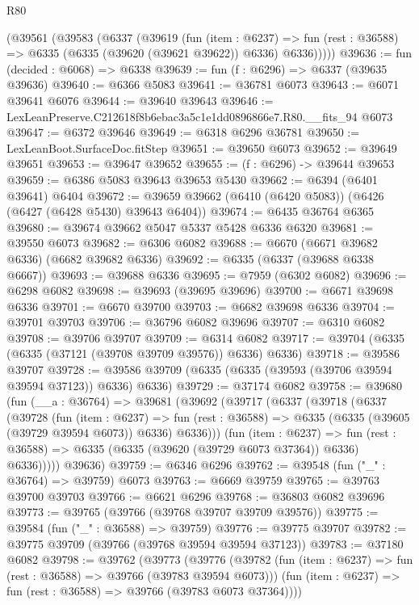 \begin{lexlean}{R80}
\begin{coremodule}
    (@39561
      (@39583
        (@6337
          (@39619
            (fun (item : @6237) =>
            fun (rest : @36588) => @6335 (@6335 (@39620 (@39621 @39622)) @6336) @6336)))))
@39636 := fun (decided : @6068) => @6338
@39639 := fun (f : @6296) => @6337 (@39635 @39636)
@39640 := @6366 @5083
@39641 := @36781 @6073
@39643 := @6071 @39641 @6076
@39644 := @39640 @39643
@39646 := LexLeanPreserve.C212618f8b6ebac3a5c1e1dd0896866e7.R80.__fits_94 @6073
@39647 := @6372 @39646
@39649 := @6318 @6296 @36781
@39650 := LexLeanBoot.SurfaceDoc.fitStep
@39651 := @39650 @6073
@39652 := @39649 @39651
@39653 := @39647 @39652
@39655 := (f : @6296) -> @39644 @39653
@39659 := @6386 @5083 @39643 @39653 @5430
@39662 := @6394 (@6401 @39641) @6404
@39672 := @39659 @39662 (@6410 (@6420 @5083)) (@6426 (@6427 (@6428 @5430) @39643 @6404))
@39674 := @6435 @36764 @6365
@39680 := @39674 @39662 @5047 @5337 @5428 @6336 @6320
@39681 := @39550 @6073
@39682 := @6306 @6082
@39688 := @6670 (@6671 @39682 @6336) (@6682 @39682 @6336)
@39692 := @6335 (@6337 (@39688 @6338 @6667))
@39693 := @39688 @6336
@39695 := @7959 (@6302 @6082)
@39696 := @6298 @6082
@39698 := @39693 (@39695 @39696)
@39700 := @6671 @39698 @6336
@39701 := @6670 @39700
@39703 := @6682 @39698 @6336
@39704 := @39701 @39703
@39706 := @36796 @6082 @39696
@39707 := @6310 @6082
@39708 := @39706 @39707
@39709 := @6314 @6082
@39717 := @39704 (@6335 (@6335 (@37121 (@39708 @39709 @39576)) @6336) @6336)
@39718 := @39586 @39707
@39728 := @39586 @39709 (@6335 (@6335 (@39593 (@39706 @39594 @39594 @37123)) @6336) @6336)
@39729 := @37174 @6082
@39758 := @39680
    (fun (__a : @36764) =>
    @39681
      (@39692
        (@39717
          (@6337
            (@39718
              (@6337
                (@39728
                  (fun (item : @6237) =>
                  fun (rest : @36588) => @6335 (@6335 (@39605 (@39729 @39594 @6073)) @6336) @6336)))
              (fun (item : @6237) =>
              fun (rest : @36588) => @6335 (@6335 (@39620 (@39729 @6073 @37364)) @6336) @6336)))))
      @39636)
@39759 := @6346 @6296
@39762 := @39548 (fun ("_" : @36764) => @39759) @6073
@39763 := @6669 @39759
@39765 := @39763 @39700 @39703
@39766 := @6621 @6296
@39768 := @36803 @6082 @39696
@39773 := @39765 (@39766 (@39768 @39707 @39709 @39576))
@39775 := @39584 (fun ("_" : @36588) => @39759)
@39776 := @39775 @39707
@39782 := @39775 @39709 (@39766 (@39768 @39594 @39594 @37123))
@39783 := @37180 @6082
@39798 := @39762
    (@39773
      (@39776
        (@39782 (fun (item : @6237) => fun (rest : @36588) => @39766 (@39783 @39594 @6073)))
        (fun (item : @6237) => fun (rest : @36588) => @39766 (@39783 @6073 @37364))))

\end{coremodule}
\end{lexlean}

